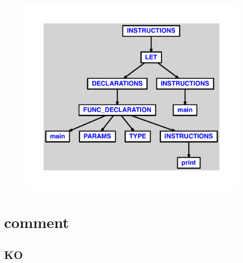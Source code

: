 \documentclass{article}
\begin{document}
\begin{figure}[H]\centering\includegraphics[max width=\textwidth]{ast/ast_142.pdf}\end{figure}\section{comment}
\subsection{KO}
\end{document}
